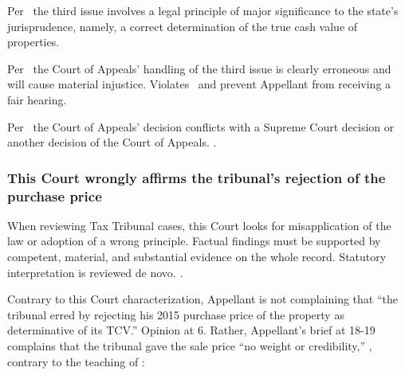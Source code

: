 \documentclass[12pt,\documentclassflag]{michiganCourtOfAppealsBrief}
\begin{document}
Per \cite{MCR 7.305(B)(3)}\ the third issue involves a legal principle of major significance to the state's jurisprudence, namely, a correct determination of the true cash value of properties. 

Per \cite{MCR 7.305(B)(5a)}\ the Court of Appeals' handling of the third issue is clearly erroneous and will cause material injustice. Violates \cite{Jones & Laughlin}\ and prevent Appellant from receiving a fair hearing.

Per \cite{MCR 7.305(B)(5b)}\ the Court of Appeals' decision conflicts with a Supreme Court decision or another decision of the Court of Appeals. \cite{Jones & Laughlin}.


\subsubsection{This Court wrongly affirms the tribunal's rejection of the purchase price}

When reviewing Tax Tribunal cases, this Court looks for misapplication of the law or adoption of a wrong principle. Factual findings must be supported by competent, material, and substantial evidence on the whole record. Statutory interpretation is reviewed de novo. .


Contrary to this Court characterization,
Appellant is not complaining that ``the tribunal erred by rejecting his 2015 purchase price of the
property as determinative of its TCV.'' Opinion at 6. Rather, Appellant's brief at 18-19 complains that the tribunal gave the sale price ``no weight or credibility,'' \reconsiderationDenied[2], contrary to the teaching of :
\end{document}
